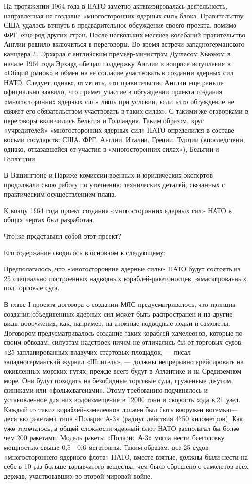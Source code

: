 \documentclass[12pt, a4paper, openany]{book}
\begin{document}
	На протяжении 1964 года в НАТО заметно активизировалась деятельность, направленная на создание «многосторонних ядерных сил» блока. Правительству США удалось втянуть в предварительное обсуждение своего проекта, помимо ФРГ, еще ряд других стран. После нескольких месяцев колебаний правительство Англии решило включиться в переговоры. Во время встречи западногерманского канцлера Л. Эрхарда с английским премьер-министром Дугласом Хьюмом в начале 1964 года Эрхард обещал поддержку Англии в вопросе вступления в «Общий рынок» в обмен на ее согласие участвовать в создании ядерных сил НАТО. Следует, однако, отметить, что правительство Англии еще раньше официально заявило, что примет участие в обсуждении проекта создания «многосторонних ядерных сил» лишь при условии, если «это обсуждение не свяжет его обязательством участвовать в таких силах». С такими же оговорками в переговоры включились Бельгия и Голландия. Таким образом, круг «учредителей» «многосторонних ядерных сил» НАТО определился в составе восьми государств: США, ФРГ, Англии, Италии, Греции, Турции (впоследствии, однако, отказавшейся от участия в «многосторонних силах»), Бельгии и Голландии.
	
	В Вашингтоне и Париже комиссии военных и юридических экспертов продолжали свою работу по уточнению технических деталей, связанных с практическим осуществлением плана.
	
	К концу 1964 года проект создания «многосторонних ядерных сил» НАТО в общих чертах был разработан.
	
	Что же представлял собой этот проект?
	
	Его содержание сводилось в основном к следующему:
	
	Предполагалось, что «многосторонние ядерные силы» НАТО будут состоять из 25 специально построенных надводных кораблей-ракетоносцев, замаскированных под торговые суда.
	
	В главе I проекта договора о создании МЯС предусматривалось, что принцип создания объединенных ядерных сил может быть распространен и на другие виды вооружения, как, например, на атомные подводные лодки и самолеты. Договором предусматривалось создание таких кораблей-хамелеонов, которые по своим обводам, силуэтам надстроек ничем не отличались бы от торговых судов. «25 запланированных плавучих стартовых площадок, — писал западногерманский журнал «Шпигель», — должны непрерывно крейсировать на оживленных морских путях, прежде всего будут в Атлантике и на Средиземном море. Они будут походить на безобидные торговые суда, груженные джутом, финиками или «фольксвагенами». Этому требованию подчинялось и установленное для них водоизмещение в 12000 тонн и скорость хода в 21 узел. Каждый из таких кораблей-хамелеонов должен был быть вооружен восемью—десятью ракетами типа «Поларис А-3» (радиус действия 4750 километров). Как уже отмечалось, в общей сложности ядерный флот НАТО располагал бы более чем 200 ракетами. Модель ракеты «Поларис А-3» могла нести боеголовку мощностью свыше 0,5—0,6 мегатонны. Таким образом, все 25 судов «многостороннего ядерного флота» НАТО, вместе взятые, должны были нести на себе в 10 раз больше взрывчатого вещества, чем было сброшено с самолетов всех держав, участвовавших во второй мировой войне.
	
\end{document}
